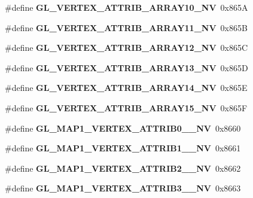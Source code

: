 \begin{DoxyCompactItemize}
\item 
\#define {\bfseries G\+L\+\_\+\+V\+E\+R\+T\+E\+X\+\_\+\+A\+T\+T\+R\+I\+B\+\_\+\+A\+R\+R\+A\+Y10\+\_\+\+N\+V}~0x865\+A\label{_s_d_l__opengl_8h_af8898bb67bea879b233a6e55675a9c4e}

\item 
\#define {\bfseries G\+L\+\_\+\+V\+E\+R\+T\+E\+X\+\_\+\+A\+T\+T\+R\+I\+B\+\_\+\+A\+R\+R\+A\+Y11\+\_\+\+N\+V}~0x865\+B\label{_s_d_l__opengl_8h_a4cea5bbb704fb4cca3ad4a31640d45ae}

\item 
\#define {\bfseries G\+L\+\_\+\+V\+E\+R\+T\+E\+X\+\_\+\+A\+T\+T\+R\+I\+B\+\_\+\+A\+R\+R\+A\+Y12\+\_\+\+N\+V}~0x865\+C\label{_s_d_l__opengl_8h_a18d2e2cbfe085148b81ff2d1e8ab8415}

\item 
\#define {\bfseries G\+L\+\_\+\+V\+E\+R\+T\+E\+X\+\_\+\+A\+T\+T\+R\+I\+B\+\_\+\+A\+R\+R\+A\+Y13\+\_\+\+N\+V}~0x865\+D\label{_s_d_l__opengl_8h_a99c532c7dc8bccb897f0ecdfe947ad78}

\item 
\#define {\bfseries G\+L\+\_\+\+V\+E\+R\+T\+E\+X\+\_\+\+A\+T\+T\+R\+I\+B\+\_\+\+A\+R\+R\+A\+Y14\+\_\+\+N\+V}~0x865\+E\label{_s_d_l__opengl_8h_a6fcd9def4174b7bf966ee3b5facc2dc7}

\item 
\#define {\bfseries G\+L\+\_\+\+V\+E\+R\+T\+E\+X\+\_\+\+A\+T\+T\+R\+I\+B\+\_\+\+A\+R\+R\+A\+Y15\+\_\+\+N\+V}~0x865\+F\label{_s_d_l__opengl_8h_a2bacb7d23f1cefe799a75fc18f003617}

\item 
\#define {\bfseries G\+L\+\_\+\+M\+A\+P1\+\_\+\+V\+E\+R\+T\+E\+X\+\_\+\+A\+T\+T\+R\+I\+B0\+\_\+\_\+\+N\+V}~0x8660\label{_s_d_l__opengl_8h_a8039e0f59b39f98409db8f488e0dfe2c}

\item 
\#define {\bfseries G\+L\+\_\+\+M\+A\+P1\+\_\+\+V\+E\+R\+T\+E\+X\+\_\+\+A\+T\+T\+R\+I\+B1\+\_\+\_\+\+N\+V}~0x8661\label{_s_d_l__opengl_8h_ab215283c4126aa7da1bb825f6a9e0069}

\item 
\#define {\bfseries G\+L\+\_\+\+M\+A\+P1\+\_\+\+V\+E\+R\+T\+E\+X\+\_\+\+A\+T\+T\+R\+I\+B2\+\_\+\_\+\+N\+V}~0x8662\label{_s_d_l__opengl_8h_a65a09724705239db031d852081f678cf}

\item 
\#define {\bfseries G\+L\+\_\+\+M\+A\+P1\+\_\+\+V\+E\+R\+T\+E\+X\+\_\+\+A\+T\+T\+R\+I\+B3\+\_\+\_\+\+N\+V}~0x8663\label{_s_d_l__opengl_8h_a0aea5c4cc61c0feaea7e4e86dc422439}


\end{DoxyCompactItemize}
